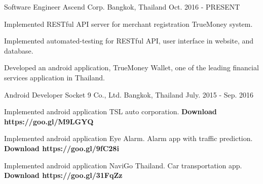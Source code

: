 

\begin{cventries}

  \cventry
    {Software Engineer} %
    {Ascend Corp.} %
    {Bangkok, Thailand} %
    {Oct. 2016 - PRESENT} %
    {
      \begin{cvitems} %
        \item {Implemented RESTful API server for merchant registration TrueMoney system.}
        \item {Implemented automated-testing for RESTful API, user interface in website, and database.}
        \item {Developed an android application, TrueMoney Wallet, one of the leading financial services application in Thailand.}
      \end{cvitems}
    }

  \cventry
    {Android Developer} %
    {Socket 9 Co., Ltd.} %
    {Bangkok, Thailand} %
    {July. 2015 - Sep. 2016} %
    {
      \begin{cvitems} %
        \item {Implemented android application TSL auto corporation. \textbf{Download https://goo.gl/M9LGYQ}}
        \item {Implemented android application Eye Alarm. Alarm app with traffic prediction. \textbf{Download https://goo.gl/9fC28i}}
        \item {Implemented android application NaviGo Thailand. Car transportation app. \textbf{Download https://goo.gl/31FqZz}}
      \end{cvitems}
    }

\end{cventries}
